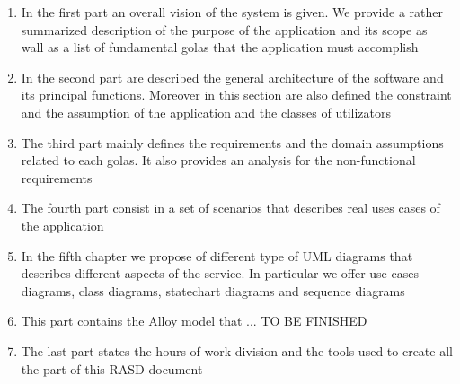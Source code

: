 \begin{enumerate}
  \item In the first part an overall vision of the system is given. We provide a rather summarized description of the purpose of the application and its scope as wall as a list of fundamental golas  that the application must accomplish
  \item In the second part are described the general architecture of the software and its principal functions. Moreover in this section are also defined the constraint and the assumption of the application and the classes of utilizators
  \item The third part mainly defines the requirements and the domain assumptions related to each golas. It also provides an analysis for the non-functional requirements
  \item The fourth part consist in a set of scenarios that describes real uses cases of the application
  \item In the fifth chapter we propose of different type of UML diagrams that describes different aspects of the service. In particular we offer use cases diagrams, class diagrams, statechart diagrams and sequence diagrams
  \item This part contains the Alloy model that ... TO BE FINISHED
  \item The last part states the hours of work division and the tools used to create all the part of this RASD document 
\end{enumerate}
